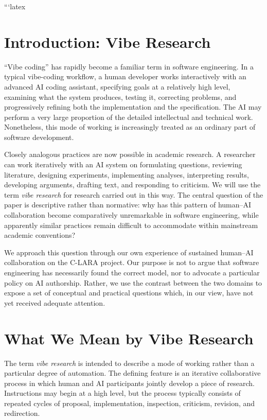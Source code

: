 ```latex
\section{Introduction: Vibe Research}

``Vibe coding'' has rapidly become a familiar term in software engineering. In a typical vibe-coding workflow, a human developer works interactively with an advanced AI coding assistant, specifying goals at a relatively high level, examining what the system produces, testing it, correcting problems, and progressively refining both the implementation and the specification. The AI may perform a very large proportion of the detailed intellectual and technical work. Nonetheless, this mode of working is increasingly treated as an ordinary part of software development.

Closely analogous practices are now possible in academic research. A researcher can work iteratively with an AI system on formulating questions, reviewing literature, designing experiments, implementing analyses, interpreting results, developing arguments, drafting text, and responding to criticism. We will use the term \emph{vibe research} for research carried out in this way. The central question of the paper is descriptive rather than normative: why has this pattern of human--AI collaboration become comparatively unremarkable in software engineering, while apparently similar practices remain difficult to accommodate within mainstream academic conventions?

We approach this question through our own experience of sustained human--AI collaboration on the C-LARA project. Our purpose is not to argue that software engineering has necessarily found the correct model, nor to advocate a particular policy on AI authorship. Rather, we use the contrast between the two domains to expose a set of conceptual and practical questions which, in our view, have not yet received adequate attention.


\section{What We Mean by Vibe Research}

The term \emph{vibe research} is intended to describe a mode of working rather than a particular degree of automation. The defining feature is an iterative collaborative process in which human and AI participants jointly develop a piece of research. Instructions may begin at a high level, but the process typically consists of repeated cycles of proposal, implementation, inspection, criticism, revision, and redirection.

